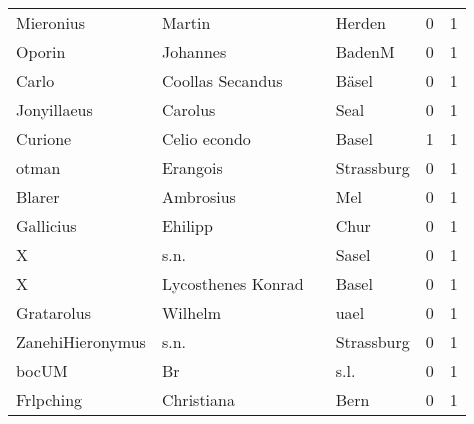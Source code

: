 \begin{center}
\begin{tiny}
\begin{longtabu}{llllrr}
                Mieronius &                             Martin &             &                                      Herden &          0 &         1 \\
                   Oporin &                           Johannes &             &                                      BadenM &          0 &         1 \\
                    Carlo &                   Coollas Secandus &             &                                       Bäsel &          0 &         1 \\
              Jonyillaeus &                            Carolus &             &                                        Seal &          0 &         1 \\
                  Curione &                       Celio econdo &             &                                       Basel &          1 &         1 \\
                    otman &                           Erangois &             &                                  Strassburg &          0 &         1 \\
                   Blarer &                          Ambrosius &             &                                         Mel &          0 &         1 \\
                Gallicius &                            Ehilipp &             &                                        Chur &          0 &         1 \\
                        X &                               s.n. &             &                                       Sasel &          0 &         1 \\
                        X &                 Lycosthenes Konrad &             &                                       Basel &          0 &         1 \\
               Gratarolus &                            Wilhelm &             &                                        uael &          0 &         1 \\
         ZanehiHieronymus &                               s.n. &             &                                  Strassburg &          0 &         1 \\
                    bocUM &                                 Br &             &                                        s.l. &          0 &         1 \\
                Frlpching &                         Christiana &             &                                        Bern &          0 &         1 \\

\end{longtabu}
\end{tiny}
\end{center}
